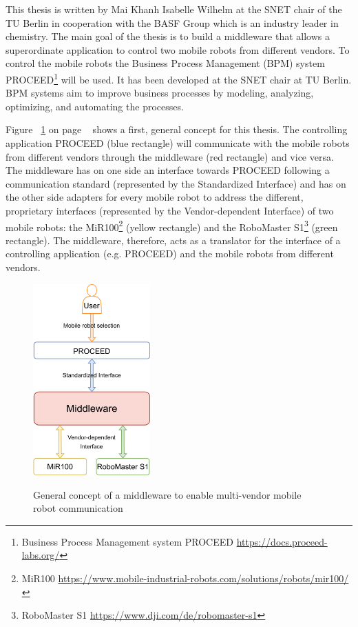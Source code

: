 This thesis is written by Mai Khanh Isabelle Wilhelm at the SNET chair of the TU Berlin in cooperation with the BASF Group which is an industry leader in chemistry. The main goal of the thesis is to build a middleware that allows a superordinate application to control two mobile robots from different vendors. To control the mobile robots the Business Process Management (BPM) system PROCEED\footnote{Business Process Management system PROCEED \url{https://docs.proceed-labs.org/}} will be used. It has been developed at the SNET chair at TU Berlin. BPM systems aim to improve business processes by modeling, analyzing, optimizing, and automating the processes. 

Figure ~\ref{fig:introduction__middleware} on page ~\pageref{fig:introduction__middleware} shows a first, general concept for this thesis. The controlling application PROCEED (blue rectangle) will communicate with the mobile robots from different vendors through the middleware (red rectangle) and vice versa. The middleware has on one side an interface towards PROCEED following a communication standard (represented by the Standardized Interface) and has on the other side adapters for every mobile robot to address the different, proprietary interfaces (represented by the Vendor-dependent Interface) of two mobile robots: the MiR100\footnote{MiR100 \url{https://www.mobile-industrial-robots.com/solutions/robots/mir100/}} (yellow rectangle) and the RoboMaster S1\footnote{RoboMaster S1 \url{https://www.dji.com/de/robomaster-s1}} (green rectangle).  The middleware, therefore, acts as a translator for the interface of a controlling application (e.g. PROCEED) and the mobile robots from different vendors. 

\begin{figure}[!ht]
	\centering
	\includegraphics[width=0.4\textwidth]{images/Middleware.png}\\
	\caption[Compact Routing Example]%
    {General concept of a middleware to enable multi-vendor mobile robot communication}
	\label{fig:introduction__middleware}
\end{figure}

